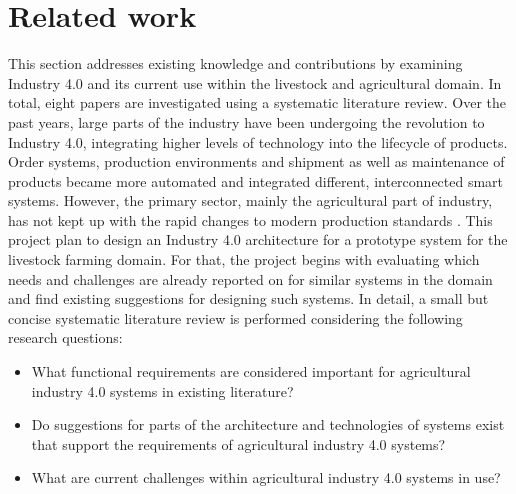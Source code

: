 \section{Related work}
\label{sec:related_work}
This section addresses existing knowledge and contributions by examining Industry 4.0 and its current use within the livestock and agricultural domain. In total, eight papers are investigated using a systematic literature review. \vspace{2mm}
\newline
Over the past years, large parts of the industry have been undergoing the revolution to Industry 4.0, integrating higher levels of technology into the lifecycle of products. Order systems, production environments and shipment as well as maintenance of products became more automated and integrated different, interconnected smart systems.
However, the primary sector, mainly the agricultural part of industry, has not kept up with the rapid changes to modern production standards \cite{pr7010036}.
This project plan to design an Industry 4.0 architecture for a prototype system for the livestock farming domain. For that, the project begins with evaluating which needs and challenges are already reported on for similar systems in the domain and find existing suggestions for designing such systems.
In detail, a small but concise systematic literature review is performed considering the following research questions:
\vspace{2mm}
\begin{itemize}
    \item What functional requirements are considered important for agricultural industry 4.0 systems in existing literature?
    \item Do suggestions for parts of the architecture and technologies of systems exist that support the requirements of agricultural industry 4.0 systems?
    \item What are current challenges within agricultural industry 4.0 systems in use?
\end{itemize}
\vspace{2mm}

